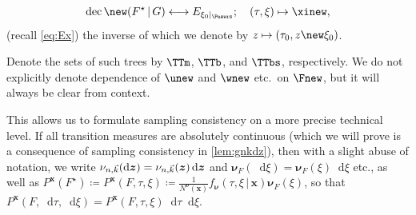 \documentclass[reqno,draft]{amsart}
\numberwithin{equation}{section}
\theoremstyle{plain}
\theoremstyle{remark}
\newcommand*\diff{\mathop{}\!\mathrm{d}}
\DeclareMathOperator{\dcb}{dec}
\DeclareMathOperator{\dcs}{sp}
\newcommand{\fnu}{f_{\boldsymbol \nu}}
\newcommand{\nunk}{\nu_{n,\smash{\vec{k}}}}
\newcommand{\gnk}{\nu_{n,\smash{\vec{k}}}}
\newcommand{\rsto}[1]{\mathord\downarrow_{#1}}
\begin{document}
\begin{enumerate}
        \begin{equation}\label{eq:bijbs}
            \dcb\new(F^\star \,\vert\,G) \longleftrightarrow E_{\xi_0\vert_{\Pnewrs}};\quad
            (\tau,\xi)  \mapsto \xinew,
        \end{equation}
        (recall \cref{eq:Ex})
        the inverse of which we denote by $z \mapsto (\tau_0,z\new\xi_0)$.
\end{enumerate}
Denote the sets of such trees by $\TTm$, $\TTb$, and $\TTbs$, respectively. We do not explicitly denote dependence of $\unew$ and $\wnew $ etc.\ on $\Fnew$, but it will always be clear from context.

This allows us to formulate sampling consistency on a more precise technical level. If all transition measures are absolutely continuous (which we will prove is a consequence of sampling consistency in \cref{lem:gnkdz}), then with a slight abuse of notation, we write $\nunk(\diff \boldsymbol z) = \gnk(\boldsymbol z)\diff \boldsymbol z$ and $\boldsymbol \nu_F(\diff \xi) = \boldsymbol \nu_F(\xi)\diff \xi$ etc., as well as $P^{\boldsymbol x}(F^\star) \coloneqq  P^{\boldsymbol x}(F,\tau,\xi) \coloneqq \frac{1}{N^{\boldsymbol \nu}(\boldsymbol x)} \fnu(\tau,\xi \,\vert\,\boldsymbol x) \boldsymbol \nu_F(\xi)$, so that $P^{\boldsymbol x}(F,\diff \tau,\diff \xi) = P^{\boldsymbol x}(F,\tau,\xi) \diff \tau\diff \xi$.
\end{document}
